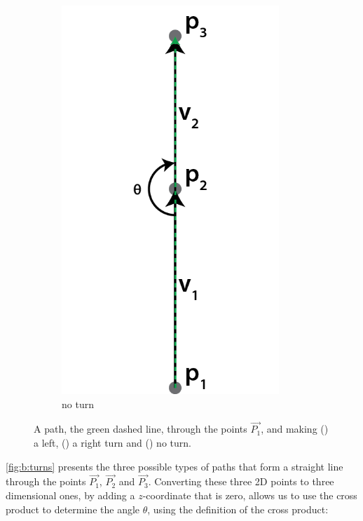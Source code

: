 \begin{figure}
\begin{subfigure}[b]{0.3\textwidth}
		\includegraphics[width=0.9\textwidth]{./img/b_noTurn}
		\caption{no turn}
		\label{subfig:b:NoTurn}
	\end{subfigure}		
	\caption{A path, the green dashed line, through the points $\vec{P_1}$,  and  making () a left, () a right turn and () no turn.}
	\label{fig:b:turns}
\end{figure}

\autoref{fig:b:turns} presents the three possible types of paths that form a straight line through the points $\vec{P_1}$, $\vec{P_2}$ and $\vec{P_3}$. Converting these three 2D points to three dimensional ones, by adding a $z$-coordinate that is zero, allows us to use the cross product to determine the angle $\theta$, using the definition of the cross product:

